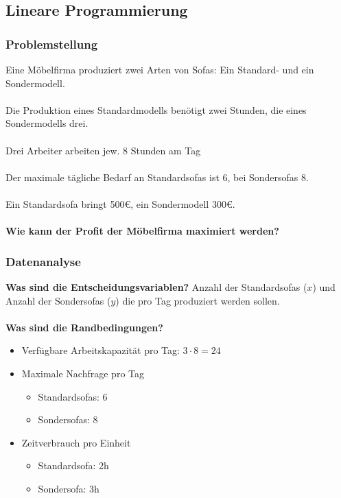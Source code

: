 \documentclass{beamer}
\begin{document}
  \subsection{Lineare Programmierung}
  \begin{frame}
    \frametitle{Problemstellung}

    Eine Möbelfirma produziert zwei Arten von Sofas: Ein Standard-
    und ein Sondermodell.
    \pause
    \\~\\

    Die Produktion eines Standardmodells benötigt zwei Stunden, die
    eines Sondermodells drei.
    \pause
    \\~\\

    Drei Arbeiter arbeiten jew. 8 Stunden am Tag
    \pause
    \\~\\

    Der maximale tägliche Bedarf an Standardsofas ist 6, bei
    Sondersofas 8.
    \pause
    \\~\\

    Ein Standardsofa bringt 500\euro, ein Sondermodell 300\euro.
    \pause
    \\~\\

    \textbf{Wie kann der Profit der Möbelfirma maximiert werden?}
  \end{frame}

  \begin{frame}
    \frametitle{Datenanalyse}

    \textbf{Was sind die Entscheidungsvariablen?}
    \linebreak
    \pause
    Anzahl der Standardsofas ($x$) und Anzahl der Sondersofas ($y$) die pro
    Tag produziert werden sollen.
    \pause
    \\~\\

    \textbf{Was sind die Randbedingungen?}
    \pause
    \begin{itemize}[<+->]
      \item Verfügbare Arbeitskapazität pro Tag: $3 \cdot 8 = 24$
      \item Maximale Nachfrage pro Tag
        \begin{itemize}
          \item Standardsofas: 6
          \item Sondersofas: 8 
        \end{itemize}
      \item Zeitverbrauch pro Einheit
        \begin{itemize}
          \item Standardsofa: 2h
          \item Sondersofa: 3h 
        \end{itemize}
    \end{itemize}
  \end{frame}
\end{document}
